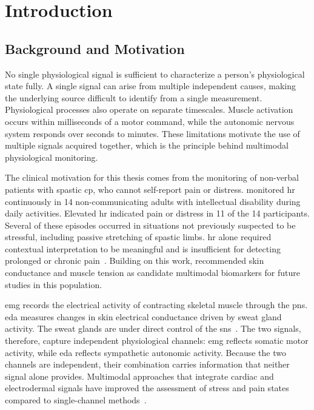 \chapter{Introduction}
\label{ch:introduction}
\section{Background and Motivation}

No single physiological signal is sufficient to characterize a person's physiological state fully. A single signal can arise from multiple independent causes, making the underlying source difficult to identify from a single measurement. Physiological processes also operate on separate timescales. Muscle activation occurs within milliseconds of a motor command, while the autonomic nervous system responds over seconds to minutes. These limitations motivate the use of multiple signals acquired together, which is the principle behind multimodal physiological monitoring.

The clinical motivation for this thesis comes from the monitoring of non-verbal patients with spastic \gls{cp}, who cannot self-report pain or distress. \textcite{kildal_increased_2021} monitored \gls{hr} continuously in 14 non-communicating adults with intellectual disability during daily activities. Elevated \gls{hr} indicated pain or distress in 11 of the 14 participants. Several of these episodes occurred in situations not previously suspected to be stressful, including passive stretching of spastic limbs. \gls{hr} alone required contextual interpretation to be meaningful and is insufficient for detecting prolonged or chronic pain~\cite{kildal_increased_2021}. Building on this work, \textcite{bull_heart_2025} recommended skin conductance and muscle tension as candidate multimodal biomarkers for future studies in this population.

\Gls{emg} records the electrical activity of contracting skeletal muscle through the \gls{pns}. \Gls{eda} measures changes in skin electrical conductance driven by sweat gland activity. The sweat glands are under direct control of the \gls{sns}~\cite{boucsein_electrodermal_2012}. The two signals, therefore, capture independent physiological channels: \gls{emg} reflects somatic motor activity, while \gls{eda} reflects sympathetic autonomic activity. Because the two channels are independent, their combination carries information that neither signal alone provides. Multimodal approaches that integrate cardiac and electrodermal signals have improved the assessment of stress and pain states compared to single-channel methods~\cite{affanni_wireless_2020, mcnaboe_design_2022}.


